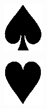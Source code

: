 \documentclass[times, zavrsni, numeric, utf8]{fer}
\begin{document}
\begin{figure}[H]
				\centering
				\begin{subfigure}[b]{0.14\textwidth}
					\centering
					\includegraphics[width=\textwidth]{templates-rank/image29.png}
					\caption{}
				\end{subfigure}
				\begin{subfigure}[b]{0.14\textwidth}
					\centering
					\includegraphics[width=\textwidth]{templates-rank/image28.png}

\end{subfigure}
\end{figure}
\end{document}
